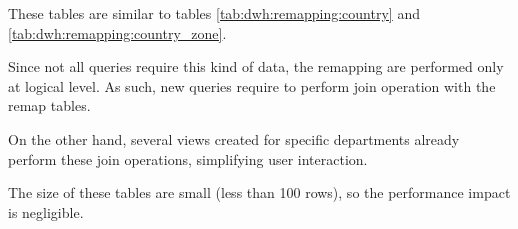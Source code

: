     These tables are similar to tables \ref{tab:dwh:remapping:country} and \ref{tab:dwh:remapping:country_zone}.
    
    Since not all queries require this kind of data, the remapping are performed only at logical level.
    As such, new queries require to perform join operation with the remap tables.
    
    On the other hand, several views created for specific departments already perform these join operations, simplifying user interaction.
    
    The size of these tables are small (less than 100 rows), so the performance impact is negligible.